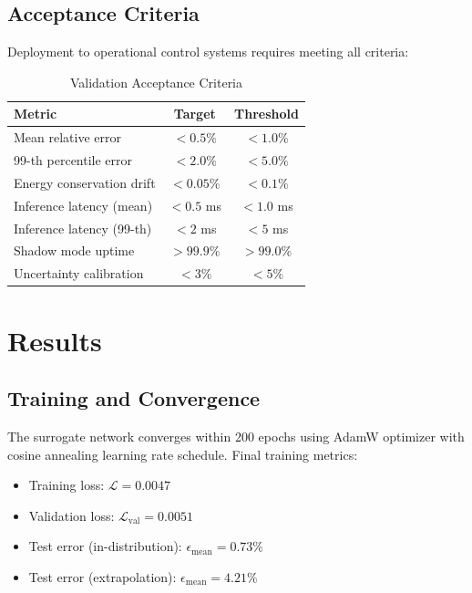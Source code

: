\documentclass[12pt]{article}
\begin{document}
\subsection{Acceptance Criteria}

Deployment to operational control systems requires meeting all criteria:

\begin{table}[h]
\centering
\caption{Validation Acceptance Criteria}
\begin{tabular}{lcc}
\toprule
Metric & Target & Threshold \\
\midrule
Mean relative error & $< 0.5\%$ & $< 1.0\%$ \\
99-th percentile error & $< 2.0\%$ & $< 5.0\%$ \\
Energy conservation drift & $< 0.05\%$ & $< 0.1\%$ \\
Inference latency (mean) & $< 0.5$ ms & $< 1.0$ ms \\
Inference latency (99-th) & $< 2$ ms & $< 5$ ms \\
Shadow mode uptime & $> 99.9\%$ & $> 99.0\%$ \\
Uncertainty calibration & $< 3\%$ & $< 5\%$ \\
\bottomrule
\end{tabular}
\end{table}

\section{Results}
\label{sec:results}

\subsection{Training and Convergence}

The surrogate network converges within 200 epochs using AdamW optimizer with cosine annealing learning rate schedule. Final training metrics:

\begin{itemize}
\item Training loss: $\mathcal{L} = 0.0047$
\item Validation loss: $\mathcal{L}_{\text{val}} = 0.0051$
\item Test error (in-distribution): $\epsilon_{\text{mean}} = 0.73\%$
\item Test error (extrapolation): $\epsilon_{\text{mean}} = 4.21\%$
\end{itemize}
\end{document}
